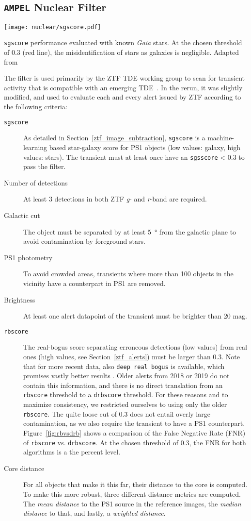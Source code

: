 \subsection{\texttt{AMPEL} Nuclear Filter}
\begin{marginfigure}
    \texttt{[image: nuclear/sgscore.pdf]}
    \caption[\texttt{sgscore} performance]{\texttt{sgscore} performance evaluated with known \textit{Gaia} stars. At the chosen threshold of 0.3 (red line), the misidentification of stars as galaxies is negligible. Adapted from~\cite{Tachibana2018}}
\end{marginfigure}
The filter is used primarily by the ZTF TDE working group to scan for transient activity that is compatible with an emerging TDE~\cite{Velzen2021a}. In the rerun, it was slightly modified, and used to evaluate each and every alert issued by ZTF according to the following criteria:
\begin{description}
    \item[\texttt{sgscore}] As detailed in Section~\ref{ztf_image_subtraction}, \texttt{sgscore} is a machine-learning based star-galaxy score for PS1 objects (low values: galaxy, high values: stars). The transient must at least once have an \texttt{sgsscore} < 0.3 to pass the filter.
    \item[Number of detections] At least 3 detections in both ZTF \textit{g}- and \textit{r}-band are required.
    \item[Galactic cut] The object must be separated by at least \SI{5}{\degree} from the galactic plane to avoid contamination by foreground stars.
    \item[PS1 photometry] To avoid crowded areas, transients where more than 100 objects in the vicinity have a counterpart in PS1 are removed.
    \item[Brightness] At least one alert datapoint of the transient must be brighter than 20 mag.
    \item[\texttt{rbscore}] The real-bogus score separating erroneous detections (low values) from real ones (high values, see Section~\ref{ztf_alerts}) must be larger than 0.3. Note that for more recent data, also \texttt{deep real bogus} is available, which promises vastly better results . Older alerts from 2018 or 2019 do not contain this information, and there is no direct translation from an \texttt{rbscore} threshold to a \texttt{drbscore} threshold. For these reasons and to maximize consistency, we restricted ourselves to using only the older \texttt{rbscore}. The quite loose cut of 0.3 does not entail overly large contamination, as we also require the transient to have a PS1 counterpart. Figure~\ref{fig:rbvsdrb} shows a comparison of the False Negative Rate (FNR) of \texttt{rbscore} vs. \texttt{drbscore}. At the chosen threshold of $0.3$, the FNR for both algorithms is a the percent level.
    \item[Core distance] For all objects that make it this far, their distance to the core is computed. To make this more robust, three different distance metrics are computed. The \emph{mean distance} to the PS1 source in the reference images, the \emph{median distance} to that, and lastly, a \emph{weighted distance}.
\end{description}

